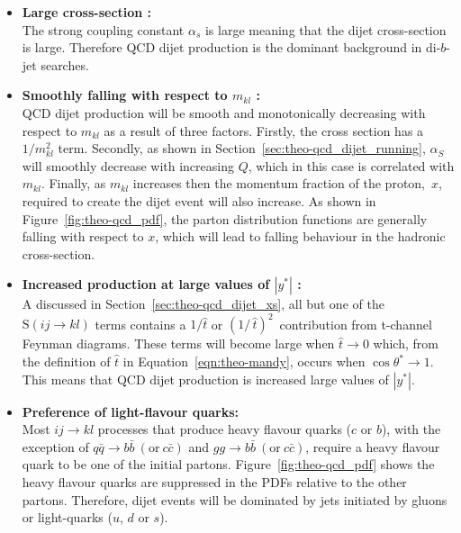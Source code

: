 \begin{itemize}[leftmargin=*]
\item\textbf{Large cross-section :}\\
  The strong coupling constant $\alpha_s$ is large meaning that the dijet cross-section is large.
  Therefore QCD dijet production is the dominant background in di-$b$-jet searches.\vspace{0.5em}
  
\item\textbf{Smoothly falling with respect to $m_{kl}$ :}\\
  QCD dijet production will be smooth and monotonically decreasing
  with respect to $m_{kl}$ as a result of three factors.
  Firstly, the cross section has a $1/m_{kl}^{2}$ term.
  Secondly, as shown in Section~\ref{sec:theo-qcd_dijet_running},
  $\alpha_S$ will smoothly decrease with increasing $Q$, which in this case is correlated with $m_{kl}$.
  Finally, as $m_{kl}$ increases then the momentum fraction of the \mbox{proton, $x$,} required to create
  the dijet event will also increase.
  As shown in Figure~\ref{fig:theo-qcd_pdf}, the parton distribution functions are generally falling 
  with respect to $x$, which will lead to falling behaviour in the hadronic cross-section.
  \vspace{0.5em}
  
\item\textbf{Increased production at large values of $|y^*|$ :}\\
  A discussed in Section~\ref{sec:theo-qcd_dijet_xs}, all but one of the $\text{S}(ij \to kl)$ terms
  contains a $1/\hat{t}$ or $(1/\,\hat{t})^2\,$ contribution from t-channel Feynman diagrams.
  These terms will become large when $\hat{t} \to 0$ which, from the definition of $\hat{t}$ in Equation~\ref{eqn:theo-mandy},
  occurs when $\cos{\theta^*} \to 1$.
  This means that QCD dijet production is increased large values of $|y^*|$.
  \vspace{0.5em}
  
\item\textbf{Preference of light-flavour quarks:}\\
  Most $ij \to kl$ processes that produce heavy flavour quarks ($c$ or $b$),
  with the exception of $q \bar{q} \to b\bar{b} \ (\text{or}\ c\bar{c})$ and $g g \to b\bar{b} \ (\text{or}\ c\bar{c})$,
  require a heavy flavour quark to be one of the initial partons.
  Figure~\ref{fig:theo-qcd_pdf} shows the heavy flavour quarks are suppressed in the PDFs relative to the other partons.
  Therefore, dijet events will be dominated by jets initiated by gluons or light-quarks ($u$, $d$ or $s$).
 
\end{itemize}

